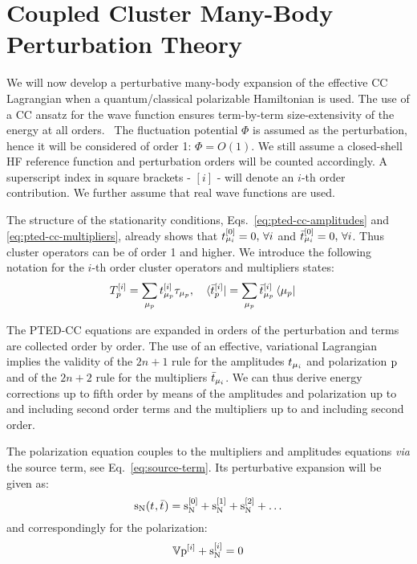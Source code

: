 \section[Coupled Cluster Many-Body Perturbation Theory]{
Coupled Cluster Many-Body Perturbation Theory}\label{sec:mbpt-polarizable}

We will now develop a perturbative many-body expansion of the effective
\acrshort{CC} Lagrangian when a quantum/classical polarizable Hamiltonian is
used.
The use of a \acrshort{CC} ansatz for the wave function ensures term-by-term
size-extensivity of the energy at all orders.~\autocite{Helgaker2000-tz}
The fluctuation potential $\Phi$ is assumed as the perturbation, hence
it will be considered of order 1: $\Phi = O(1)$.
We still assume a closed-shell \acrshort{HF} reference function and
perturbation orders will be counted accordingly.
A superscript index in square brackets - $[i]$ -  will denote an $i$-th
order contribution.
We further assume that real wave functions are used.

The structure of the stationarity conditions,
Eqs.~\eqref{eq:pted-cc-amplitudes} and \eqref{eq:pted-cc-multipliers},
already shows that $t_{\mu_i}^{[0]} = 0, \,\forall i$ and
$\bar{t}_{\mu_i}^{[0]} = 0, \, \forall i$.
Thus cluster operators can be of order 1 and higher. We introduce the
following notation for the $i$-th order cluster operators and
multipliers states:
\begin{alignat}{2}
  T_p^{[i]} = \sum_{\mu_p}t_{\mu_p}^{[i]}\tau_{\mu_p},
  \quad&
  \bra{\bar{t}_{p}^{[i]}} = \sum_{\mu_p}\bar{t}_{\mu_p}^{[i]}\bra{\mu_p}
\end{alignat}

The \acrshort{PTED}-\acrshort{CC} equations are expanded in orders of the
perturbation and terms are collected order by order. The use of an
effective, variational Lagrangian implies the validity of the $2n+1$
rule for the amplitudes $t_{\mu_i}$ and polarization $\mathrm{p}$ and of the
$2n+2$ rule for the multipliers $\bar{t}_{\mu_i}$.
We can thus derive energy corrections up to fifth order by means of the
amplitudes and polarization up to and including second order terms and
the multipliers up to and including second order.

The polarization equation couples to the multipliers and amplitudes
equations \emph{via} the source term, see Eq.~\eqref{eq:source-term}.
Its perturbative expansion will be given as:
\begin{equation}\label{eq:source-term-pt}
  \mathrm{s}_{\mathrm{N}}(t_{},\bar{t}_{}) =
  \mathrm{s}_{\mathrm{N}}^{[0]}
  + \mathrm{s}_{\mathrm{N}}^{[1]}
  + \mathrm{s}_{\mathrm{N}}^{[2]}
  + \ldots
\end{equation}
and correspondingly for the polarization:
\begin{equation}\label{eq:pol-eq-pt}
  \mathbb{V}\mathrm{p}^{[i]} + \mathrm{s}_{\mathrm{N}}^{[i]} = 0
\end{equation}

